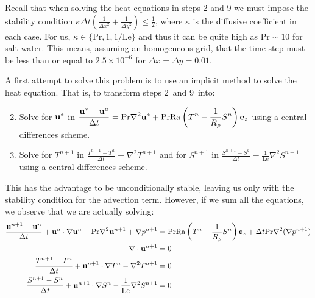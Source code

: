 \documentclass{article}
\def\Ra{\mathrm{Ra}}
\def\Pr{\mathrm{Pr}}
\def\Le{\mathrm{Le}}
\begin{document}
Recall that when solving the heat equations in steps 2 and 9 we must impose the stability condition $\kappa \Delta t\left( \frac{1}{{\Delta x}^2} + \frac{1}{{\Delta y}^2}\right) \leq \frac{1}{2}$, where $\kappa$ is the diffusive coefficient in each case. For us, $\kappa \in \{\Pr, 1, 1/\Le\}$ and thus it can be quite high as $\Pr\sim 10$ for salt water. This means, assuming an homogeneous grid, that the time step must be less than or equal to $2.5\times 10^{-6}$ for $\Delta x = \Delta y = 0.01$.

A first attempt to solve this problem is to use an implicit method to solve the heat equation. That is, to transform steps 2\ and 9\ into:
\begin{enumerate}
  \setcounter{enumi}{1}
  \item Solve for $\boldsymbol{\mathrm{u}}^*$ in $\displaystyle  \frac{\vf{u}^* - \vf{u}^a}{\Delta t} = \Pr \nabla^2 \vf{u}^* +\Pr\Ra\left(T^n - \frac{1}{R_{\rho}}S^n\right)\vf{e}_z$ using a central differences scheme.
        \setcounter{enumi}{8}
  \item Solve for $T^{n+1}$ in $\displaystyle  \frac{T^{n+1}-T^{a}}{\Delta t} = \nabla^2 T^{n+1}$ and for $S^{n+1}$ in $\displaystyle  \frac{S^{n+1}-S^{a}}{\Delta t} = \frac{1}{\Le}\nabla^2 S^{n+1}$ using a central differences scheme.
\end{enumerate}

This has the advantage to be unconditionally stable, leaving us only with the stability condition for the advection term. However, if we sum all the equations, we observe that we are actually solving:
\begin{align*}
  \frac{\vf{u}^{n+1}-\vf{u}^n}{\Delta t} + \vf{u}^n \cdot \nabla \vf{u}^n - \Pr \nabla^2 \vf{u}^{n+1} + \nabla p^{n+1} & = \Pr\Ra\left(T^n - \frac{1}{R_{\rho}}S^n\right)\vf{e}_z+\Delta t \Pr \nabla^2(\nabla p^{n+1}) \\
  \nabla \cdot \vf{u}^{n+1}                                                                                            & = 0                                                                                            \\
  \frac{T^{n+1}-T^{n}}{\Delta t} + \vf{u}^{n+1} \cdot \nabla T^{n} - \nabla^2 T^{n+1}                                  & = 0                                                                                            \\
  \frac{S^{n+1}-S^{n}}{\Delta t} + \vf{u}^{n+1} \cdot \nabla S^{n} - \frac{1}{\Le}\nabla^2 S^{n+1}                     & = 0
\end{align*}
\end{document}
